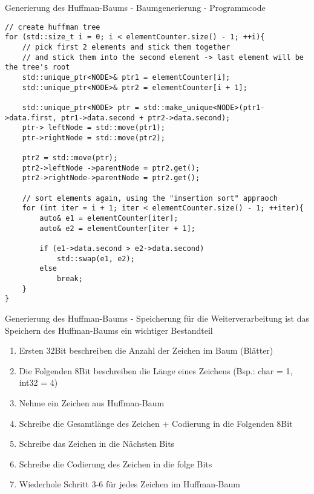 \documentclass{beamer}
\begin{document}
     \begin{frame}[fragile]{Generierung des Huffman-Baums - \newline Baumgenerierung - Programmcode}
     	\begin{lstlisting}[style=numbers]
// create huffman tree
for (std::size_t i = 0; i < elementCounter.size() - 1; ++i){
    // pick first 2 elements and stick them together
    // and stick them into the second element -> last element will be the tree's root
    std::unique_ptr<NODE>& ptr1 = elementCounter[i];
    std::unique_ptr<NODE>& ptr2 = elementCounter[i + 1];

    std::unique_ptr<NODE> ptr = std::make_unique<NODE>(ptr1->data.first, ptr1->data.second + ptr2->data.second);
    ptr-> leftNode = std::move(ptr1);
    ptr->rightNode = std::move(ptr2);

    ptr2 = std::move(ptr);
    ptr2->leftNode ->parentNode = ptr2.get();
    ptr2->rightNode->parentNode = ptr2.get();

    // sort elements again, using the "insertion sort" appraoch
    for (int iter = i + 1; iter < elementCounter.size() - 1; ++iter){
        auto& e1 = elementCounter[iter];
        auto& e2 = elementCounter[iter + 1];

        if (e1->data.second > e2->data.second)
            std::swap(e1, e2);
        else
            break;
    }
}
\end{lstlisting}
\end{frame}

  
  \begin{frame}{Generierung des Huffman-Baums - \newline Speicherung} \label{HeaderFile}
	für die Weiterverarbeitung ist das Speichern des Huffman-Baums ein wichtiger Bestandteil
  	\begin{enumerate}
  		\item Ersten 32Bit beschreiben die Anzahl der Zeichen im Baum (Blätter)
  		\item Die Folgenden 8Bit beschreiben die Länge eines Zeichens \newline (Bsp.: char = 1, int32 = 4)
  		\item Nehme ein Zeichen aus Huffman-Baum
  		\item Schreibe die Gesamtlänge des Zeichen + Codierung in die Folgenden 8Bit
  		\item Schreibe das Zeichen in die Nächsten Bits
  		\item Schreibe die Codierung des Zeichen in die folge Bits
  		\item Wiederhole Schritt 3-6 für jedes Zeichen im Huffman-Baum
  	\end{enumerate}
  \end{frame}
  
\end{document}
